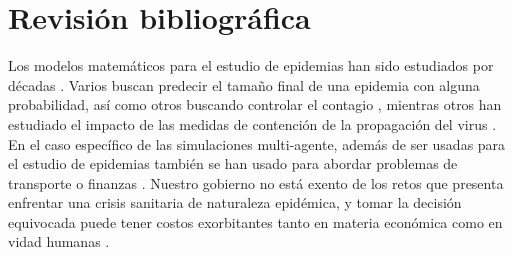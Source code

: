 \chapter{Revisión bibliográfica}\label{ch:litreview}

Los modelos matemáticos para el estudio de epidemias han sido estudiados por décadas \citep{bailey_mathematical_1975, britton_stochastic_2010}. Varios buscan predecir el tamaño final de una epidemia con alguna probabilidad, así como otros buscando controlar el contagio \citep{Nowzari_etal_2016}, mientras otros han estudiado el impacto de las medidas de contención de la propagación del virus \citep{fransson_sir_2019}. En el caso específico de las simulaciones multi-agente, además de ser usadas para el estudio de epidemias \citep{Hassin_2021, Hoertel_Blachier_Blanco_etal_2020, Perez_Dragicevic_2009} también se han usado para abordar problemas de transporte \citep{Horl_2017} o finanzas \citep{Samitas2018}. Nuestro gobierno no está exento de los retos que presenta enfrentar una crisis sanitaria de naturaleza epidémica, y tomar la decisión equivocada puede tener costos exorbitantes tanto en materia económica como en vidad humanas \citep{Lipsitch_etal_2011, Maringe_etal_2020, Pasquini_etal_2017}. 
